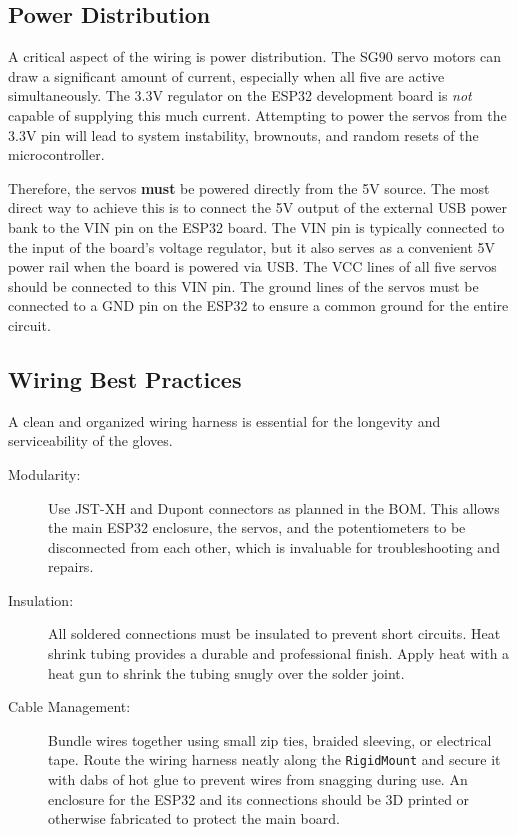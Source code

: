 \documentclass{article}
\begin{document}
\subsection{Power Distribution}
A critical aspect of the wiring is power distribution. The SG90 servo motors can draw a significant amount of current, especially when all five are active simultaneously. The 3.3V regulator on the ESP32 development board is \textit{not} capable of supplying this much current. Attempting to power the servos from the 3.3V pin will lead to system instability, brownouts, and random resets of the microcontroller.

Therefore, the servos \textbf{must} be powered directly from the 5V source. The most direct way to achieve this is to connect the 5V output of the external USB power bank to the VIN pin on the ESP32 board. The VIN pin is typically connected to the input of the board's voltage regulator, but it also serves as a convenient 5V power rail when the board is powered via USB. The VCC lines of all five servos should be connected to this VIN pin. The ground lines of the servos must be connected to a GND pin on the ESP32 to ensure a common ground for the entire circuit.

\subsection{Wiring Best Practices}
A clean and organized wiring harness is essential for the longevity and serviceability of the gloves.
\begin{description}
    \item[Modularity:] Use JST-XH and Dupont connectors as planned in the BOM. This allows the main ESP32 enclosure, the servos, and the potentiometers to be disconnected from each other, which is invaluable for troubleshooting and repairs.
    \item[Insulation:] All soldered connections must be insulated to prevent short circuits. Heat shrink tubing provides a durable and professional finish. Apply heat with a heat gun to shrink the tubing snugly over the solder joint.
    \item[Cable Management:] Bundle wires together using small zip ties, braided sleeving, or electrical tape. Route the wiring harness neatly along the \texttt{RigidMount} and secure it with dabs of hot glue to prevent wires from snagging during use. An enclosure for the ESP32 and its connections should be 3D printed or otherwise fabricated to protect the main board.
\end{description}
\end{document}
